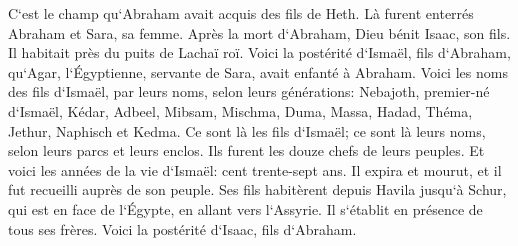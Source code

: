 \verse C`est le champ qu`Abraham avait acquis des fils de Heth. Là furent enterrés Abraham et Sara, sa femme. 
\verse Après la mort d`Abraham, Dieu bénit Isaac, son fils. Il habitait près du puits de Lachaï roï. 
\verse Voici la postérité d`Ismaël, fils d`Abraham, qu`Agar, l`Égyptienne, servante de Sara, avait enfanté à Abraham. 
\verse Voici les noms des fils d`Ismaël, par leurs noms, selon leurs générations: Nebajoth, premier-né d`Ismaël, Kédar, Adbeel, Mibsam, 
\verse Mischma, Duma, Massa, 
\verse Hadad, Théma, Jethur, Naphisch et Kedma. 
\verse Ce sont là les fils d`Ismaël; ce sont là leurs noms, selon leurs parcs et leurs enclos. Ils furent les douze chefs de leurs peuples. 
\verse Et voici les années de la vie d`Ismaël: cent trente-sept ans. Il expira et mourut, et il fut recueilli auprès de son peuple. 
\verse Ses fils habitèrent depuis Havila jusqu`à Schur, qui est en face de l`Égypte, en allant vers l`Assyrie. Il s`établit en présence de tous ses frères. 
\verse Voici la postérité d`Isaac, fils d`Abraham. 

